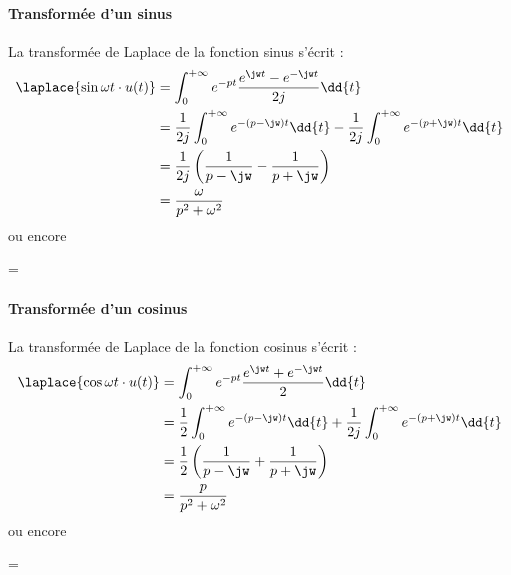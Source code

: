\paragraph{Transformée d'un sinus}
La transformée de Laplace de la fonction sinus s'écrit :
\begin{align*}
\laplace{\sin{\omega t}\cdot u(t)}&=
\int_{0}^{+\infty}e^{-pt}\dfrac{e^{\jw t}-e^{-\jw t}}{2j}\dd{t}\\
&=\dfrac{1}{2j}\int_{0}^{+\infty}e^{-(p-\jw)t}\dd{t} - 
  \dfrac{1}{2j}\int_{0}^{+\infty}e^{-(p+\jw)t}\dd{t} \\
&=\dfrac{1}{2j}\left( \dfrac{1}{p-\jw}-\dfrac{1}{p+\jw}\right)\\
&=\dfrac{\omega}{p^2+\omega^2}
\end{align*}
ou encore
\begin{bequation}
    =
\end{bequation}
\paragraph{Transformée d'un cosinus}
La transformée de Laplace de la fonction cosinus s'écrit :
\begin{align*}
\laplace{\cos{\omega t}\cdot u(t)}&=\int_{0}^{+\infty}e^{-pt}
\dfrac{e^{\jw t}+e^{-\jw t}}{2}\dd{t}\\
&=\dfrac{1}{2}\int_{0}^{+\infty}e^{-(p-\jw)t}\dd{t} + 
\dfrac{1}{2j}\int_{0}^{+\infty}e^{-(p+\jw)t}\dd{t} \\
&=\dfrac{1}{2}\left( \dfrac{1}{p-\jw}+\dfrac{1}{p+\jw}\right)\\
&=\dfrac{p}{p^2+\omega^2}
\end{align*}
ou encore
\begin{bequation}
    =
\end{bequation}
\newpage

\captionsetup{width=0.9\linewidth,labelfont=bf}
